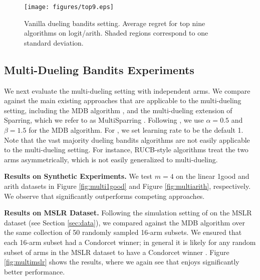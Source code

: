 

\begin{figure}[t]
\centering
\texttt{[image: figures/top9.eps]}
\vspace{-0.1in}
\caption{Vanilla dueling bandits setting.  Average regret for top nine algorithms on logit/arith. Shaded regions correspond to one standard deviation.}
\label{fig:best9}
\end{figure}

\subsection{Multi-Dueling Bandits Experiments}

We next evaluate the multi-dueling setting with independent arms.  We compare against the main existing approaches that are applicable to the multi-dueling setting, including the MDB algorithm \citep{brost2016multi}, and the multi-dueling extension of Sparring, which we refer to as MultiSparring \citep{ailon2014reducing}.  
Following \cite{brost2016multi}, we use $\alpha=0.5$ and $\beta=1.5$ for the MDB algorithm. For \multisparring, we set learning rate to be the default 1.  Note that the vast majority dueling bandits algorithms are not easily applicable to the multi-dueling setting.  For instance, RUCB-style algorithms treat the two arms asymmetrically, which is not easily generalized to multi-dueling.

\textbf{Results on Synthetic Experiments.}
We test $m=4$ on the linear 1good and arith datasets in Figure \ref{fig:multi1good} and Figure \ref{fig:multiarith}, respectively. We observe that \multisparring significantly outperforms competing approaches.

\textbf{Results on MSLR Dataset.} Following the simulation setting of \cite{brost2016multi} on the MSLR dataset (see Section \ref{sec:data}), we compared against the MDB algorithm over the same collection of 50 randomly sampled 16-arm subsets. We ensured that each 16-arm subset had a Condorcet winner; in general it is likely for any random subset of arms in the MSLR dataset to have a Condorcet winner \citep{zoghi2015copeland}.  
Figure \ref{fig:multimslr} shows the results, where we again see that \multisparring enjoys significantly better performance.  %


